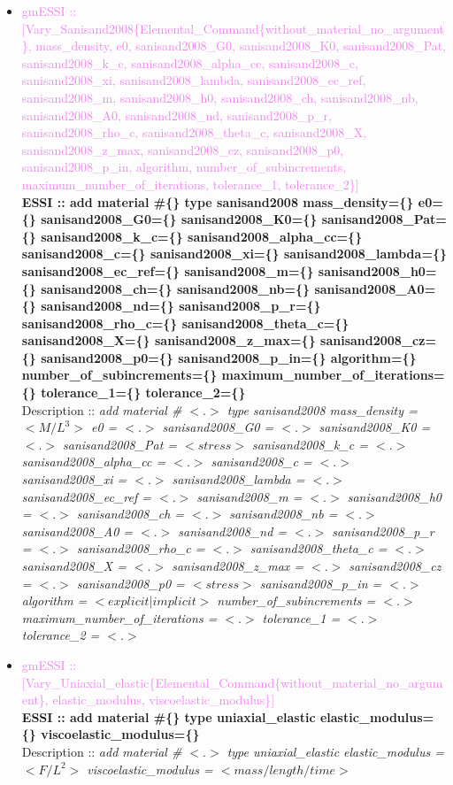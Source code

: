\documentclass[11pt]{article}
\begin{document}
\begin{itemize}
    \item \textcolor{violet}{gmESSI :: [Vary\_Sanisand2008\{Elemental\_Command\{without\_material\_no\_argument\}, mass\_density, e0, sanisand2008\_G0, sanisand2008\_K0, sanisand2008\_Pat, sanisand2008\_k\_c, sanisand2008\_alpha\_cc, sanisand2008\_c, sanisand2008\_xi, sanisand2008\_lambda, sanisand2008\_ec\_ref, sanisand2008\_m, sanisand2008\_h0, sanisand2008\_ch, sanisand2008\_nb, sanisand2008\_A0, sanisand2008\_nd, sanisand2008\_p\_r, sanisand2008\_rho\_c, sanisand2008\_theta\_c, sanisand2008\_X, sanisand2008\_z\_max, sanisand2008\_cz, sanisand2008\_p0, sanisand2008\_p\_in, algorithm, number\_of\_subincrements, maximum\_number\_of\_iterations, tolerance\_1, tolerance\_2\}]}\\
    \textbf{ESSI :: add material \#\{\} type sanisand2008 mass\_density=\{\}  e0=\{\}  sanisand2008\_G0=\{\}  sanisand2008\_K0=\{\} sanisand2008\_Pat=\{\} sanisand2008\_k\_c=\{\}  sanisand2008\_alpha\_cc=\{\} sanisand2008\_c=\{\}  sanisand2008\_xi=\{\}  sanisand2008\_lambda=\{\}  sanisand2008\_ec\_ref=\{\}  sanisand2008\_m=\{\}  sanisand2008\_h0=\{\}  sanisand2008\_ch=\{\}  sanisand2008\_nb=\{\}  sanisand2008\_A0=\{\} sanisand2008\_nd=\{\}  sanisand2008\_p\_r=\{\}  sanisand2008\_rho\_c=\{\}  sanisand2008\_theta\_c=\{\}  sanisand2008\_X=\{\}  sanisand2008\_z\_max=\{\}  sanisand2008\_cz=\{\}  sanisand2008\_p0=\{\}  sanisand2008\_p\_in=\{\}  algorithm=\{\}  number\_of\_subincrements=\{\}  maximum\_number\_of\_iterations=\{\}  tolerance\_1=\{\}  tolerance\_2=\{\}}\\
    Description ::  \textit{ add material \# $<.>$ type sanisand2008 mass\_density = $<M/L^3>$  e0 = $<.>$  sanisand2008\_G0 = $<.>$  sanisand2008\_K0 = $<.>$ sanisand2008\_Pat = $<stress>$ sanisand2008\_k\_c = $<.>$  sanisand2008\_alpha\_cc = $<.>$ sanisand2008\_c = $<.>$  sanisand2008\_xi = $<.>$  sanisand2008\_lambda = $<.>$  sanisand2008\_ec\_ref = $<.>$  sanisand2008\_m = $<.>$  sanisand2008\_h0 = $<.>$  sanisand2008\_ch = $<.>$  sanisand2008\_nb = $<.>$  sanisand2008\_A0 = $<.>$ sanisand2008\_nd = $<.>$  sanisand2008\_p\_r = $<.>$  sanisand2008\_rho\_c = $<.>$  sanisand2008\_theta\_c = $<.>$  sanisand2008\_X = $<.>$  sanisand2008\_z\_max = $<.>$  sanisand2008\_cz = $<.>$  sanisand2008\_p0 = $<stress>$  sanisand2008\_p\_in = $<.>$  algorithm = $<explicit|implicit>$  number\_of\_subincrements = $<.>$  maximum\_number\_of\_iterations = $<.>$  tolerance\_1 = $<.>$  tolerance\_2 = $<.>$} 

    \item \textcolor{violet}{gmESSI :: [Vary\_Uniaxial\_elastic\{Elemental\_Command\{without\_material\_no\_argument\}, elastic\_modulus, viscoelastic\_modulus\}]}\\
    \textbf{ESSI :: add material \#\{\} type uniaxial\_elastic elastic\_modulus=\{\} viscoelastic\_modulus=\{\}}\\
    Description ::  \textit{ add material \# $<.>$ type uniaxial\_elastic elastic\_modulus = $<F/L^2>$ viscoelastic\_modulus = $<mass / length / time>$ } 


\end{itemize}
\end{document}
